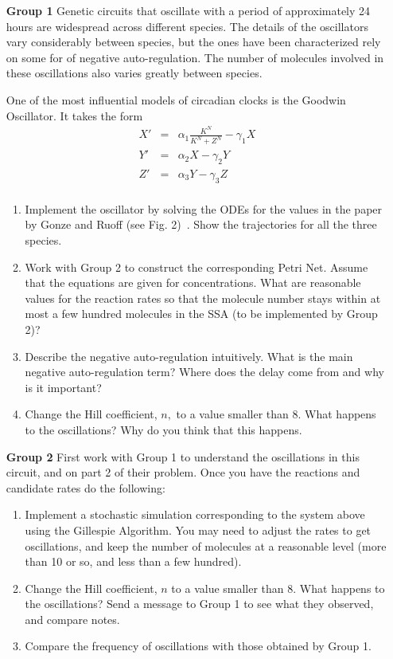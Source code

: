 \documentclass[12pt]{article}
\begin{document}
%
\begin{enumerate}
\item[\bf Group 1] Genetic circuits that oscillate with a period of approximately 24 hours are widespread across different species.  The details of the oscillators  vary considerably between species, but  the ones have been characterized rely on some for of negative auto-regulation. The number of molecules involved in these oscillations also varies greatly between species. 

One of the most influential models of circadian clocks is the Goodwin Oscillator.  It takes the form 
\begin{eqnarray*}
X' &=& \alpha_1 \frac{K^N}{K^N + Z^N} - \gamma_1 X \\
Y' &= & \alpha_2 X - \gamma_2 Y \\
Z' &=& \alpha_3 Y - \gamma_3 Z \\
\end{eqnarray*}

\begin{enumerate}
\item Implement the oscillator by solving the ODEs for the values in the paper by Gonze and Ruoff (see Fig. 2)~\cite{gonze20}.  Show the trajectories for all the three species.
\item Work with Group 2 to construct the corresponding Petri Net.  Assume that the equations are given for concentrations. What are reasonable values for the reaction rates so that the molecule number stays within at most a few hundred molecules in the SSA (to be implemented by Group 2)?  
\item Describe the negative auto-regulation intuitively. What is the main negative auto-regulation term?  Where does the delay come from and why is it important?
\item Change the Hill coefficient, $n,$ to a value smaller than 8. What happens to the oscillations?  Why do you think that this happens.
\end{enumerate}

\item[\bf Group 2] 
First work with Group 1 to understand the oscillations in this circuit, and on part 2 of their problem. Once you have the reactions 
and candidate rates do the following:
\begin{enumerate}
\item Implement a stochastic simulation corresponding to the system above using the Gillespie Algorithm.  You may need to 
adjust the rates to get oscillations, and keep the number of molecules at a reasonable level (more than 10 or so, and less than a few hundred).
\item Change the Hill coefficient, $n$ to a value smaller than 8. What happens to the oscillations?  Send a message to Group 1 to see
what they observed, and compare notes.
\item Compare the frequency of oscillations with those obtained by Group 1.  
\end{enumerate}


\end{enumerate}
\end{document}
